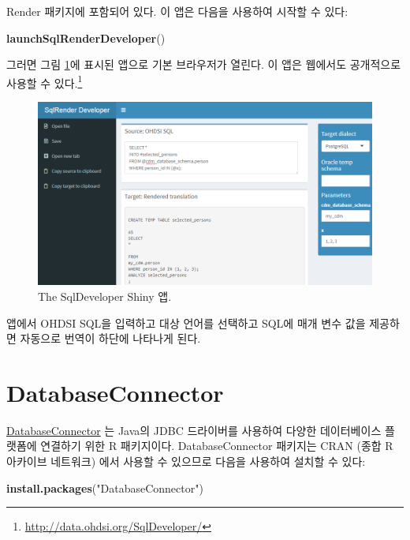 \documentclass[11pt]{book}
\newenvironment{Shaded}{\begin{snugshade}}{\end{snugshade}}
\newcommand{\KeywordTok}[1]{\textcolor[rgb]{0.13,0.29,0.53}{\textbf{#1}}}
\newcommand{\StringTok}[1]{\textcolor[rgb]{0.31,0.60,0.02}{#1}}
\newcommand{\NormalTok}[1]{#1}
\let\rmarkdownfootnote\footnote%
\def\footnote{\protect\rmarkdownfootnote}
\theoremstyle{definition}
\theoremstyle{definition}
\theoremstyle{definition}
\theoremstyle{remark}
\begin{document}
Render 패키지에 포함되어 있다. 이 앱은 다음을 사용하여 시작할 수 있다:

\begin{Shaded}
\begin{Highlighting}[]
\KeywordTok{launchSqlRenderDeveloper}\NormalTok{()}
\end{Highlighting}
\end{Shaded}

그러면 그림 \ref{fig:sqlDeveloper}에 표시된 앱으로 기본 브라우저가
열린다. 이 앱은 웹에서도 공개적으로 사용할 수 있다.\footnote{\url{http://data.ohdsi.org/SqlDeveloper/}}

\begin{figure}

{\centering \includegraphics[width=1\linewidth]{images/SqlAndR/sqlDeveloper} 

}

\caption{The SqlDeveloper Shiny 앱.}\label{fig:sqlDeveloper}
\end{figure}

앱에서 OHDSI SQL을 입력하고 대상 언어를 선택하고 SQL에 매개 변수 값을
제공하면 자동으로 번역이 하단에 나타나게 된다.

\hypertarget{DatabaseConnector}{\section{DatabaseConnector}\label{DatabaseConnector}}

\href{https://ohdsi.github.io/DatabaseConnector/}{DatabaseConnector} 는
Java의 JDBC 드라이버를 사용하여 다양한 데이터베이스 플랫폼에 연결하기
위한 R 패키지이다. DatabaseConnector 패키지는 CRAN (종합 R 아카이브
네트워크) 에서 사용할 수 있으므로 다음을 사용하여 설치할 수 있다:

\begin{Shaded}
\begin{Highlighting}[]
\KeywordTok{install.packages}\NormalTok{(}\StringTok{"DatabaseConnector"}\NormalTok{)}
\end{Highlighting}
\end{Shaded}
\end{document}
